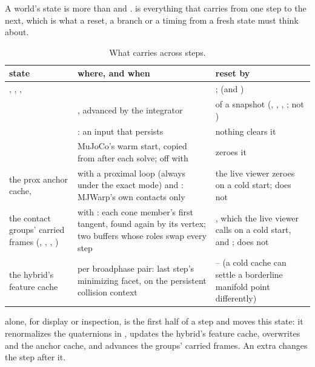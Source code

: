 A world's state is more than  and .  is everything that carries from one step to the next, which is what a reset, a branch or a timing from a fresh state must think about.

\begin{table}[t]
\centering
\caption{What carries across steps.}
\label{tab:carried}
\small
\begin{tabularx}{\linewidth}{@{}L{34mm}YL{40mm}@{}}
\toprule
state & where, and when & reset by \\
\midrule
{}, , ,  &  & ;  (and ) \\
 & , advanced by the integrator &  of a  snapshot (, , , ; not ) \\
 & : an input that persists & nothing clears it \\
 & MuJoCo's warm start, copied from  after each solve; off with  &  zeroes it \\
the prox anchor cache,  & with a proximal loop (always under the exact mode) and : MJWarp's own contacts only & the live viewer zeroes  on a cold start;  does not \\
the contact groups' carried frames (, , , ) & with : each cone member's first tangent, found again by its vertex; two buffers whose roles swap every step & , which the live viewer calls on a cold start, and ;  does not \\
the hybrid's feature cache & per broadphase pair: last step's minimizing facet, on the persistent collision context & -- (a cold cache can settle a borderline manifold point differently) \\
\bottomrule
\end{tabularx}
\end{table}

 alone, for display or inspection, is the first half of a step and moves this state: it renormalizes the quaternions in , updates the hybrid's feature cache, overwrites  and the anchor cache, and advances the groups' carried frames. An extra  changes the step after it.

